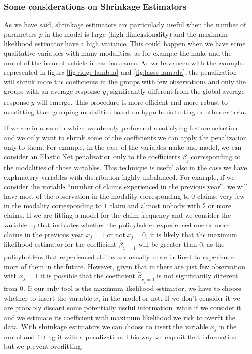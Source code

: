 \documentclass[a4paper, nobind]{templates/ociamthesis}
\theoremstyle{definition}
\theoremstyle{definition}
\theoremstyle{definition}
\theoremstyle{remark}
\begin{document}
\hypertarget{chap:shrinkage-considerations}{%
\subsubsection{Some considerations on Shrinkage Estimators}\label{chap:shrinkage-considerations}}

As we have said, shrinkage estimators are particularly useful when the number of parameters \(p\) in the model is large (high dimensionality) and the maximum likelihood estimator have a high variance. This could happen when we have some qualitative variables with many modalities, as for example the make and the model of the insured vehicle in car insurance. As we have seen with the examples represented in figure \ref{fig:ridge-lambda} and \ref{fig:lasso-lambda}, the penalization will shrink more the coefficients in the groups with few observations and only the groups with an average response \(\bar{y}_j\) significantly different from the global average response \(\bar{y}\) will emerge. This procedure is more efficient and more robust to overfitting than grouping modalities based on hypothesis testing or other criteria.

If we are in a case in which we already performed a satisfying feature selection and we only want to shrink some of the coefficients we can apply the penalization only to them. For example, in the case of the variables make and model, we can consider an Elastic Net penalization only to the coefficients \(\beta_j\) corresponding to the modalities of those variables. This technique is useful also in the case we have explanatory variables with distribution highly unbalanced. For example, if we consider the variable ``number of claims experienced in the previous year'', we will have most of the observation in the modality corresponding to \(0\) claims, very few in the modality corresponding to \(1\) claim and almost nobody with \(2\) or more claims. If we are fitting a model for the claim frequency and we consider the variable \(x_j\) that indicates whether the policyholder experienced one or more claims in the previous year \(x_j=1\) or not \(x_j=0\), it is likely that the maximum likelihood estimator for the coefficient \(\hat{\beta}_{x_j=1}\) will be greater than \(0\), as the policyholders that experienced claims are usually more inclined to experience more of them in the future. However, given that in there are just few observation with \(x_j=1\) it is possible that the coefficient \(\hat{\beta}_{x_j=1}\) is not significantly different from \(0\). If our only tool is the maximum likelihood estimator, we have to choose whether to insert the variable \(x_j\) in the model or not. If we don't consider it we are probably discard some potentially useful information, while if we consider it and we estimate its coefficient with maximum likelihood we risk to overfit the data. With shrinkage estimators we can choose to insert the variable \(x_j\) in the model and fitting it with a penalization. This way we exploit that information but we prevent overfitting.
\end{document}
